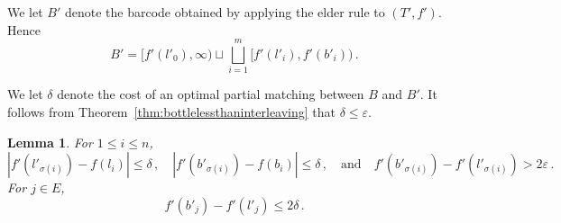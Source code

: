 \documentclass{article}
\newtheorem{lemma}[theorem]{Lemma}
\theoremstyle{definition}
\renewcommand{\epsilon}{\varepsilon}
\begin{document}
We let $B'$ denote the barcode obtained by applying the elder rule to $(T',f')$. Hence
\begin{equation*}
    B' = \big[f'(l'_0), \infty\big) \sqcup \bigsqcup_{i = 1}^m \big[f'(l'_i), f'(b'_i)\big)\,.
\end{equation*}

We let $\delta$ denote the cost of an optimal partial matching between $B$ and $B'$. It follows from Theorem~\ref{thm:bottlelessthaninterleaving} that $\delta \leq \epsilon$.

\begin{lemma}
    \label{lem:deltaclose}
    For $1 \leq i \leq n$,
    \begin{equation*}
        |f'(l'_{\sigma(i)}) - f(l_i)| \leq \delta\,,  \quad |f'(b'_{\sigma(i)}) - f(b_i)| \leq \delta\,,\quad \text{and}\quad f'(b'_{\sigma(i)}) - f'(l'_{\sigma(i)}) > 2\epsilon\,.
    \end{equation*}
    For $j \in E$,
    \begin{equation*}
        f'(b'_j) - f'(l'_j) \leq 2\delta\,.
    \end{equation*}
\end{lemma}
\end{document}
